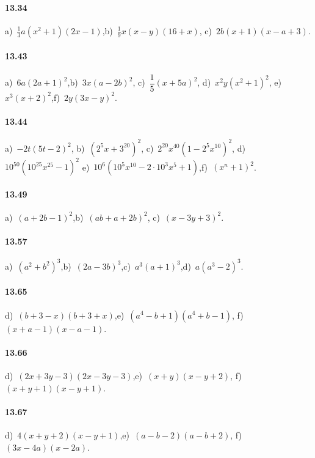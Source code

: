 \paragraph{13.34}
a)~$\frac{1}{3}a(x^{2}+1)(2x-1)$,\quad b)~$\frac{1}{9}x(x-y)(16+x)$, \quad c)~$2b(x+1)(x-a+3)$.

\paragraph{13.43}
a)~$6a(2a+1)^{2}$,\quad b)~$3x(a-2b)^{2}$, \quad c)~$\dfrac{1}{5}(x+5a)^{2}$, \quad d)~$x^{2}y\left(x^{2}+1\right)^{2}$, \quad e)~$x^{3}(x+2)^{2}$,\quad f)~$2y(3x-y)^{2}$.

\paragraph{13.44}
a)~$-2t(5t-2)^{2}$, \quad b)~$\left(2^{5}x+3^{20}\right)^{2}$, \quad c)~$2^{20} x^{40}\left(1-2^{5}x^{10} \right)^2$, \quad d)~$10^{50}\left(10^{25} x^{25}-1 \right)^2$ \quad e)~$10^{6} \left(10^{5} x^{10}-2 \cdot 10^{3}x^{5}+1\right)$,\quad f)~$\left(x^{n}+1\right)^2$.

\paragraph{13.49}
a)~$(a+2b-1)^{2}$,\quad b)~$(ab+a+2b)^{2}$, \quad c)~$(x-3y+3)^{2}$.

\paragraph{13.57}
a)~$\left(a^{2}+b^{2}\right)^{3}$,\quad b)~$(2a-3b)^{3}$,\quad c)~$a^{3}(a+1)^{3}$,\quad d)~$a\left(a^3-2\right)^3$.

\paragraph{13.65}
d)~$(b+3-x)(b+3+x)$,\quad e)~$(a^{4}-b+1)(a^{4}+b-1)$, \quad f)~$(x+a-1)(x-a-1)$.

\paragraph{13.66}
d)~$(2x+3y-3)(2x-3y-3)$,\quad e)~$(x+y)(x-y+2)$, \quad f)~$(x+y+1)(x-y+1)$.

\paragraph{13.67}
d)~$4(x+y+2)(x-y+1)$,\quad e)~$(a-b-2)(a-b+2)$, \quad f)~$(3x-4a)(x-2a)$.

